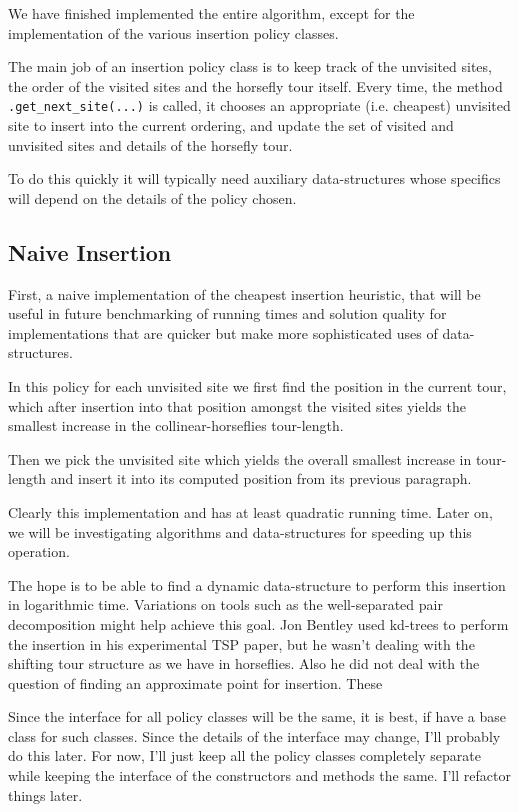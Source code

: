 \documentclass[11.5pt]{report}
\begin{document}
We have finished implemented the entire algorithm, except 
for the implementation of the various insertion policy classes. 

The main job of an insertion policy class is to keep track 
of the  unvisited sites,  the order of the visited sites and the 
horsefly tour itself. Every time, the method \verb|.get_next_site(...)| is called, it 
chooses an appropriate (i.e. cheapest) unvisited site to insert 
into the current ordering, and update the set of visited and unvisited sites
and details of the horsefly tour.  

To do this quickly it will typically need auxiliary data-structures whose specifics 
will depend on the details of the policy chosen. 

\subsection{Naive Insertion} \quad First, a naive implementation
  of the cheapest insertion heuristic, that will be useful in future
  benchmarking of running times and solution quality for implementations 
  that are quicker but make more sophisticated uses of data-structures. 

  In this policy for each unvisited site we first find the 
  position in the current tour, which after insertion into that position
  amongst the visited sites yields the smallest increase in the 
  collinear-horseflies tour-length. 

  Then we pick the unvisited site which yields the overall smallest 
  increase in tour-length and insert it into its computed position
  from its previous paragraph. 
     
  Clearly this implementation and has at least quadratic running time. 
  Later on, we will be investigating algorithms and data-structures 
  for speeding up this operation. 

  The hope is to be able to find a dynamic data-structure to perform this 
  insertion in logarithmic time. Variations on tools such as the well-separated pair 
  decomposition might help achieve this goal. Jon Bentley
  used kd-trees to perform the insertion in his experimental TSP
  paper, but he wasn't dealing with the shifting tour structure
  as we have in horseflies. Also he did not deal with the question 
  of finding an approximate point for insertion. These 

\newchunk Since the interface for all policy classes will be the same, it is 
best, if have a base class for such classes. Since the details of 
the interface may change, I'll probably do this later. For now, 
I'll just keep all the policy classes completely separate while 
keeping the interface of the constructors and methods the same. 
I'll refactor things later. 
\end{document}
